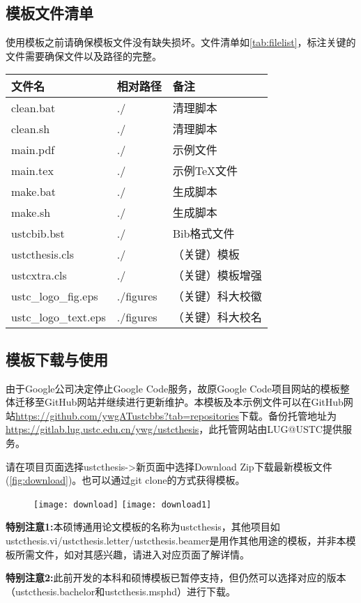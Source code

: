 \subsection{模板文件清单}
使用模板之前请确保模板文件没有缺失损坏。文件清单如\autoref{tab:filelist}，标注关键的文件需要确保文件以及路径的完整。
\begin{table}[htp]
\centering
{}
\label{tab:filelist}
\begin{tabular}{lll}
\toprule
文件名&相对路径&备注\tabularnewline
\midrule
clean.bat			&./			&清理脚本\tabularnewline
clean.sh			&./			&清理脚本\tabularnewline
main.pdf			&./			&示例文件\tabularnewline
main.tex 			&./			&示例TeX文件\tabularnewline
make.bat			&./			&生成脚本\tabularnewline
make.sh				&./			&生成脚本\tabularnewline
ustcbib.bst		&./			&Bib格式文件\tabularnewline
ustcthesis.cls		&./			&（关键）模板\tabularnewline
ustcxtra.cls		&./			&（关键）模板增强\tabularnewline
ustc\_logo\_fig.eps	&./figures	&（关键）科大校徽\tabularnewline
ustc\_logo\_text.eps&./figures	&（关键）科大校名\tabularnewline
\bottomrule
\end{tabular}
\end{table}

\subsection{模板下载与使用}
由于Google公司决定停止Google Code服务，故原Google Code项目网站的模板整体迁移至GitHub网站并继续进行更新维护。本模板及本示例文件可以在GitHub网
站\url{https://github.com/ywgATustcbbs?tab=repositories}下载。备份托管地址为\url{https://gitlab.lug.ustc.edu.cn/ywg/ustcthesis}，此托管网站由LUG@USTC提供服务。

请在项目页面选择ustcthesis->新页面中选择Download Zip下载最新模板文件(\autoref{fig:download})。也可以通过git clone的方式获得模板。

\begin{figure}
\centering
\texttt{[image: download]}
\texttt{[image: download1]}
\label{fig:download}
\end{figure}

\textbf{特别注意1:}本硕博通用论文模板的名称为ustcthesis，其他项目如ustcthesis.vi/ustcthesis.letter/ustcthesis.beamer是用作其他用途的模板，并非本模板所需文件，如对其感兴趣，请进入对应页面了解详情。

\textbf{特别注意2:}此前开发的本科和硕博模板已暂停支持，但仍然可以选择对应的版本（ustcthesis.bachelor和ustcthesis.msphd）进行下载。

